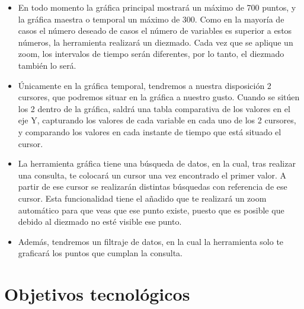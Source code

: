 \begin{itemize}
\item En todo momento la gráfica principal mostrará un máximo de 700 puntos, y la gráfica maestra o temporal un máximo de 300. Como en la mayoría de casos el número deseado de casos el número de variables es superior a estos números, la herramienta realizará un diezmado. Cada vez que se aplique un zoom, los intervalos de tiempo serán diferentes, por lo tanto, el diezmado también lo será. 

\item Únicamente en la gráfica temporal, tendremos a nuestra disposición 2 cursores, que podremos situar en la gráfica a nuestro gusto. Cuando se sitúen los 2 dentro de la gráfica, saldrá una tabla comparativa de los valores en el eje Y, capturando los valores de cada variable en cada uno de los 2 cursores, y comparando los valores en cada instante de tiempo que está situado el cursor.


\item La herramienta gráfica tiene una búsqueda de datos, en la cual, tras realizar una consulta, te colocará un cursor una vez encontrado el primer valor. A partir de ese cursor se realizarán distintas búsquedas con referencia de ese cursor. Esta funcionalidad tiene el añadido que te realizará un zoom automático para que veas que ese punto existe, puesto que es posible que debido al diezmado no esté visible ese punto.

\item Además, tendremos un filtraje de datos, en la cual la herramienta solo te graficará los puntos que cumplan la consulta.


\end{itemize}




\section{Objetivos tecnológicos}

